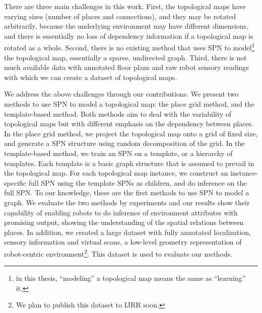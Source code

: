 \documentclass[11pt, titlepage]{article}
\theoremstyle{definition}
\begin{document}

There are three main challenges in this work. First, the topological maps have varying sizes (number of places and connections), and they may be rotated arbitrarily, because the underlying environment may have different dimensions, and there is essentially no loss of dependency information if a topological map is rotated as a whole. Second, there is no existing method that uses SPN to model\footnote{in this thesis, ``modeling'' a topological map means the same as ``learning'' it.} the topological map, essentially a sparse, undirected graph. Third, there is not much available data with annotated floor plans and raw robot sensory readings with which we can create a dataset of topological maps. 


We address the above challenges through our contributions. We present two methods to use SPN to model a topological map: the place grid method, and the template-based method. Both methods aim to deal with the variability of topological maps but with different emphasis on the dependency between places. In the place grid method, we project the topological map onto a grid of fixed size, and generate a SPN structure using random decomposition of the grid. In the template-based method, we train an SPN on a template, or a hierarchy of templates. Each template is a basic graph structure that is assumed to prevail in the topological map. For each topological map instance, we construct an instance-specific full SPN using the template SPNs as children, and do inference on the full SPN. To our knowledge, these are the first methods to use SPN to model a graph. We evaluate the two methods by experiments and our results show their capability of enabling robots to do inference of environment attributes with promising output, showing the understanding of the spatial relations between places. In addition, we created a large dataset with fully annotated localization, sensory information and virtual scans, a low-level geometry representation of robot-centric environment\footnote{We plan to publish this dataset to IJRR soon.}. This dataset is used to evaluate our methods.
\end{document}
